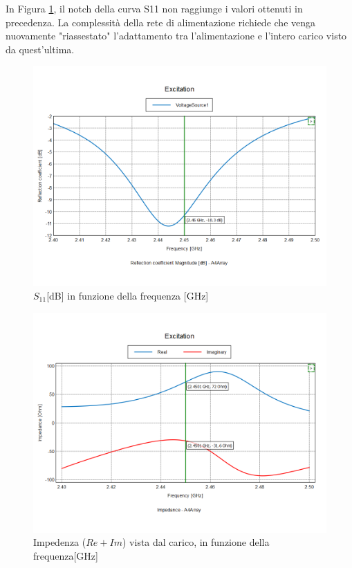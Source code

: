 \documentclass[twoside,twocolumn]{article}
\begin{document}
In Figura \ref{fig:Array4E_S11}, il notch della curva S11 non raggiunge i valori ottenuti in precedenza. \newline
La complessità della rete di alimentazione richiede che venga  nuovamente "riassestato" l'adattamento tra l'alimentazione e l'intero carico visto da quest'ultima.\
\begin{figure}[h]
  \includegraphics[width=\linewidth]{Array4E_S11.png}
  \caption{$S_{11} $[dB] in funzione della frequenza [GHz]}
  \label{fig:Array4E_S11}
\end{figure}

\begin{figure}[h]
  \includegraphics[width=\linewidth]{Array4E_impedenza.png}
  \caption{Impedenza ($Re +Im$) vista dal carico, in funzione della frequenza[GHz]}
  \label{fig:Array4E_impedenza}
\end{figure}
\end{document}
